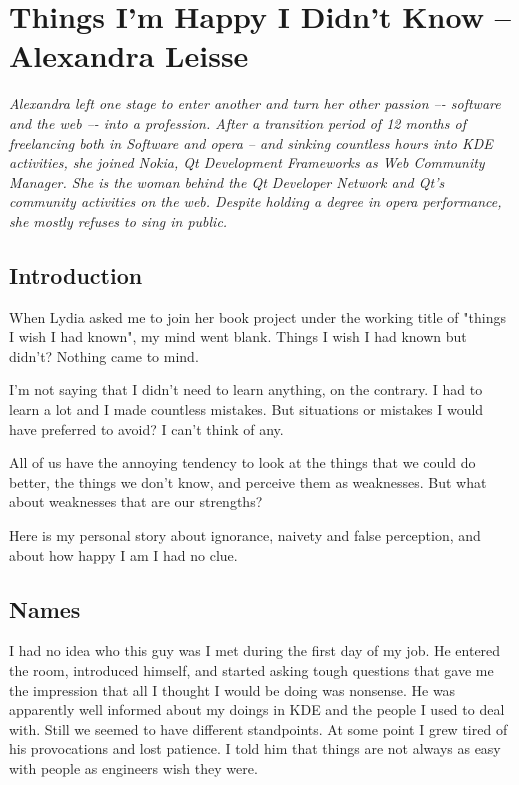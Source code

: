 \chapter{Things I'm Happy I Didn't Know -- Alexandra Leisse}

\textit{Alexandra left one stage to enter another and turn her other passion –- software and the web –- into a profession. After a transition period of 12 months of freelancing both in Software and opera -- and sinking countless hours into KDE activities, she joined Nokia, Qt Development Frameworks as Web Community Manager.
\newline
She is the woman behind the Qt Developer Network and Qt’s community activities on the web. Despite holding a degree in opera performance, she mostly refuses to sing in public.}

\section{Introduction}

When Lydia asked me to join her book project under the working title of "things I wish I had known", my mind went blank. Things I wish I had known but didn't? Nothing came to mind.

I'm not saying that I didn't need to learn anything, on the contrary. I had to learn a lot and I made countless mistakes. But situations or mistakes I would have preferred to avoid? I can't think of any.

All of us have the annoying tendency to look at the things that we could do better, the things we  don't know, and perceive them as weaknesses. But what about weaknesses that are our strengths?

Here is my personal story about ignorance, naivety and false perception, and about how happy I am I had no clue.

\section{Names}

I had no idea who this guy was I met during the first day of my job. He entered the room, introduced himself, and started asking tough questions that gave me the impression that all I thought I would be doing was nonsense. He was apparently well informed about my doings in KDE and the people I used to deal with. Still we seemed to have different standpoints. At some point I grew tired of his provocations and lost patience. I told him that things are not always as easy with people as engineers wish they were.

